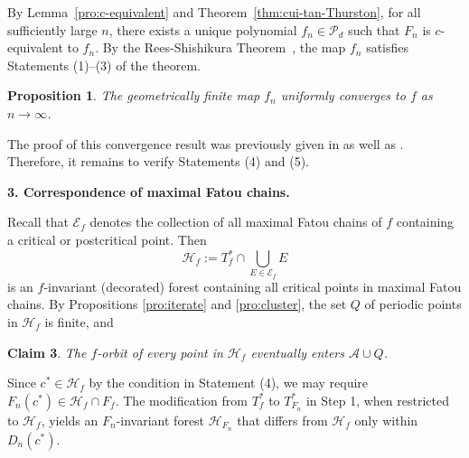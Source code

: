 \documentclass[a4paper,reqno,times, 11pt]{amsart}
\newtheorem{proposition}[theorem]{Proposition}
\theoremstyle{remark}
\theoremstyle{plain}
\numberwithin{equation}{section}
\def\AAA{{\cal A}}
\def\EEE{{\cal E}}
\def\HHH{{\cal H}}
\def\PPPP{\mathscr P}
\def\cal{\mathcal}
\begin{document}
		
		By Lemma~\ref{pro:c-equivalent} and Theorem~\ref{thm:cui-tan-Thurston}, for all sufficiently large $n$, there exists a unique polynomial $f_n \in \PPPP_d$ such that $F_n$ is $c$-equivalent to $f_n$. By the Rees-Shishikura Theorem~\cite{CPT}, the map $f_n$ satisfies Statements (1)--(3) of the theorem.
		
		\begin{proposition}\label{pro:convergence}
			The geometrically finite map $f_n$ uniformly converges to $f$ as $n\to\infty$.
		\end{proposition}
		
		The proof of this convergence result was previously given in \cite[Proposition 3.3]{G} as well as \cite[Step IV of the proof of Theorem 1.1]{GZ}. Therefore, it remains to verify Statements (4) and (5).\vspace{5pt}
		
		{\bf 3. Correspondence of maximal Fatou chains.}
		\vspace{5pt}
		
		Recall that $\EEE_f$ denotes the collection of all maximal Fatou chains of $f$ containing a critical or postcritical point.
		Then
		\begin{equation}\label{eq:5555}
		\mathcal{H}_f := T_f^* \cap \bigcup_{E\in\mathcal{E}_f} E
		\end{equation}
		is an $f$-invariant (decorated) forest containing all critical  points in maximal Fatou chains. By Propositions \ref{pro:iterate} and \ref{pro:cluster}, the set $Q$ of  periodic points in $\HHH_f$ is  finite, and \vspace{5pt}
		
		 {\bf Claim 3}. \emph{The $f$-orbit of every point in $\HHH_f$ eventually enters $\AAA\cup Q$.}
		\vspace{5pt}
		
		
	
		
		Since $c^* \in \HHH_f$ by the condition in Statement (4), we may require $F_n(c^*)\in \HHH_f\cap F_f$. The modification from $T_f^*$ to $T^*_{F_n}$ in Step 1, when restricted to $\HHH_f$, yields an $F_n$-invariant forest $\HHH_{F_n}$ that differs from $\HHH_f$ only within $D_n(c^*)$.
		
		
		\vspace{5pt}
		
\end{document}
